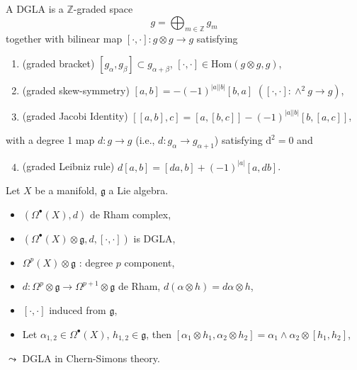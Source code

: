 \documentclass[10pt]{article}
\begin{document}
\begin{definition}
  A DGLA is a $\mathbb{Z}$-graded space
  \begin{equation*}
    g = \bigoplus_{m \in \mathbb{Z}} g_m
  \end{equation*}
  together with bilinear map $[\cdot,\cdot]: g \otimes g \to g$ satisfying
  \begin{enumerate}
    \item (graded bracket) $[g_\alpha, g_\beta] \subset g_{\alpha+\beta}$, $[\cdot,\cdot] \in \text{Hom}(g \otimes g, g)$,
    \item (graded skew-symmetry) $[a,b] = -(-1)^{|a||b|}[b,a]$ \quad $\left([\cdot,\cdot]: \wedge^2 g \to g\right)$,
    \item (graded Jacobi Identity) $[[a,b],c] = [a,[b,c]] - (-1)^{|a||b|}[b,[a,c]]$,
  \end{enumerate}
  with a degree 1 map $d: g \to g$ (i.e., $d: g_\alpha \to g_{\alpha+1}$) satisfying $ \mathrm{d} ^{2} = 0$ and
  \begin{enumerate}
      \setcounter{enumi}{3}
    \item (graded Leibniz rule) $d[a,b] = [da,b] + (-1)^{|a|}[a,db]$.
  \end{enumerate}
\end{definition}

\begin{example}[de-Rham + Lie = DGLA]
  Let $X$ be a manifold, $\mathfrak{g}$ a Lie algebra.
  \begin{itemize}
    \item $(\Omega^{\bullet}(X), d)$ de Rham complex,
    \item $(\Omega^{\bullet}(X) \otimes \mathfrak{g}, d, [\cdot,\cdot])$ is DGLA,
    \item $\Omega^p(X) \otimes \mathfrak{g}$ : degree $p$ component,
    \item $d: \Omega^p \otimes \mathfrak{g} \to \Omega^{p+1} \otimes \mathfrak{g}$ de Rham, $d(\alpha \otimes h) = d\alpha \otimes h$,
    \item $[\cdot,\cdot]$ induced from $\mathfrak{g}$,
    \item Let $ \alpha_{1,2} \in \Omega^{\bullet}(X)$, $ h_{1,2} \in \mathfrak{g}$, then $[\alpha_1 \otimes h_1, \alpha_2 \otimes h_2] = \alpha_1 \wedge \alpha_2 \otimes [h_1, h_2]$,
  \end{itemize}
  $\leadsto$ DGLA in Chern-Simons theory.
\end{example}
\end{document}
